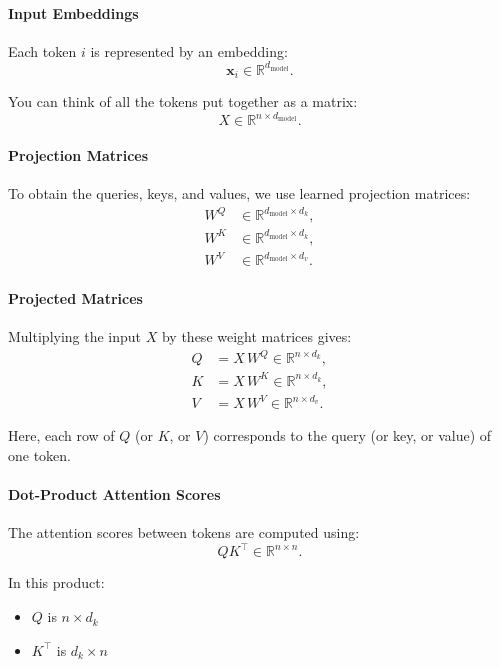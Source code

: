 \paragraph{Input Embeddings}

   Each token \( i \) is represented by an embedding:
   \[
   \mathbf{x}_i \in \mathbb{R}^{d_{\text{model}}}.
   \]
   
   You can think of all the tokens put together as a matrix:
   \[
   X \in \mathbb{R}^{n \times d_{\text{model}}}.
   \]

\paragraph{Projection Matrices}

   To obtain the queries, keys, and values, we use learned projection matrices:
   \[
   \begin{aligned}
   W^Q &\in \mathbb{R}^{d_{\text{model}} \times d_k}, \\
   W^K &\in \mathbb{R}^{d_{\text{model}} \times d_k}, \\
   W^V &\in \mathbb{R}^{d_{\text{model}} \times d_v}.
   \end{aligned}
   \]

\paragraph{Projected Matrices}
   Multiplying the input \( X \) by these weight matrices gives:
   \[
   \begin{aligned}
   Q &= X\,W^Q \in \mathbb{R}^{n \times d_k}, \\
   K &= X\,W^K \in \mathbb{R}^{n \times d_k}, \\
   V &= X\,W^V \in \mathbb{R}^{n \times d_v}.
   \end{aligned}
   \]
   
   Here, each row of \( Q \) (or \( K \), or \( V \)) corresponds to the query (or key, or value) of one token.

\paragraph{Dot-Product Attention Scores}

   The attention scores between tokens are computed using:
   \[
   QK^\top \in \mathbb{R}^{n \times n}.
   \]
   
   In this product:
   \begin{itemize}
	   \item \( Q \) is \( n \times d_k \)
	   \item \( K^\top \) is \( d_k \times n \)
   \end{itemize}
   
